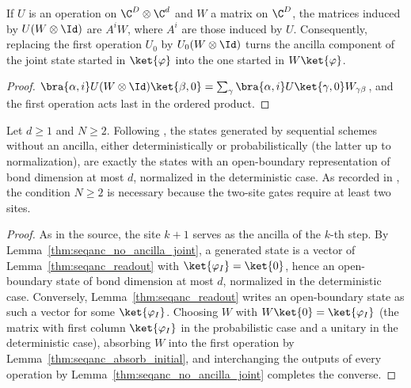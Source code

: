 \begin{lemma}
    \label{thm:seqanc_absorb_initial}
    \leanok
    If $U$ is an operation on $\C^D\otimes\C^d$ and $W$ a matrix on $\C^D$, the
    matrices induced by $U(W\otimes\Id)$ are $A^iW$, where $A^i$ are those
    induced by $U$. Consequently, replacing the first operation $U_0$ by
    $U_0(W\otimes\Id)$ turns the ancilla component of the joint state started
    in $\ket{\varphi}$ into the one started in $W\ket{\varphi}$.
\end{lemma}
\begin{proof}
    \leanok
    $\bra{\alpha,i}U(W\otimes\Id)\ket{\beta,0}
        =\sum_\gamma\bra{\alpha,i}U\ket{\gamma,0}W_{\gamma\beta}$, and the
    first operation acts last in the ordered product.
\end{proof}

\begin{theorem}
    \label{thm:seqanc_no_ancilla}
    \leanok
    Let $d\ge 1$ and $N\ge 2$. Following \cite[Section~5,
        Theorem ``Sequential generation without ancilla'']{PerezGarcia2007Matrix}, the states generated by sequential schemes without an
    ancilla, either deterministically or probabilistically (the latter up to
    normalization), are exactly the states with an open-boundary
    representation of bond dimension at most $d$, normalized in the
    deterministic case.
    As recorded in \cite{gap:pgvwc07_sequential_no_ancilla_two_sites}, the condition $N\ge 2$ is necessary because the two-site gates require at
    least two sites.
\end{theorem}
\begin{proof}
    \leanok
    As in the source, the site $k+1$ serves as the ancilla of the $k$-th step.
    By Lemma~\ref{thm:seqanc_no_ancilla_joint}, a generated state is a
    vector of Lemma~\ref{thm:seqanc_readout} with $\ket{\varphi_I}=\ket{0}$,
    hence an open-boundary state of bond dimension at most $d$, normalized in
    the deterministic case. Conversely, Lemma~\ref{thm:seqanc_readout}
    writes an open-boundary state as such a vector for some
    $\ket{\varphi_I}$. Choosing $W$ with $W\ket{0}=\ket{\varphi_I}$ (the matrix
    with first column $\ket{\varphi_I}$ in the probabilistic case and a
    unitary in the deterministic case), absorbing $W$ into the first operation by
    Lemma~\ref{thm:seqanc_absorb_initial}, and interchanging the outputs of
    every operation by Lemma~\ref{thm:seqanc_no_ancilla_joint} completes the converse.
\end{proof}

